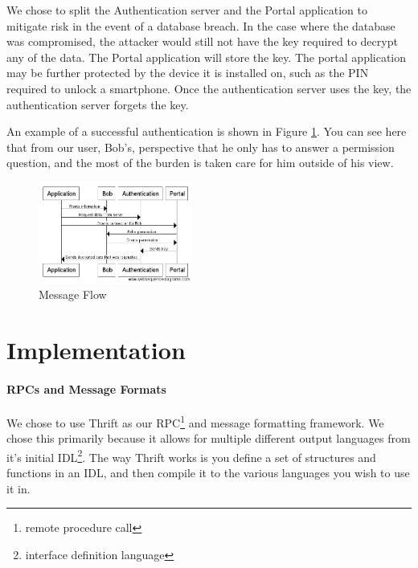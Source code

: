 \documentclass[letterpaper,twocolumn,10pt]{article}
\begin{document}
We chose to split the Authentication server and the Portal application to mitigate risk in the event of a database breach. In the case where the database was compromised, the attacker would still not have the key required to decrypt any of the data. The Portal application will store the key. The portal application may be further protected by the device it is installed on, such as the PIN required to unlock a smartphone. Once the authentication server uses the key, the authentication server forgets the key.


An example of a successful authentication is shown in Figure \ref{messageflow}. You can see here that from our user, Bob's, perspective that he only has to answer a permission question, and the most of the burden is taken care for him outside of his view.

\begin{figure}[ht]
\includegraphics[width=0.45\textwidth]{messageDiagram}
\caption{Message Flow}
\label{messageflow}
\end{figure}

\section{Implementation}

\paragraph{RPCs and Message Formats}
    We chose to use Thrift\cite{thrift} as our RPC\footnote{remote procedure call} and message formatting framework. We chose this primarily because it allows for multiple different output languages from it's initial IDL\footnote{interface definition language}. The way Thrift works is you define a set of structures and functions in an IDL, and then compile it to the various languages you wish to use it in. 
    
\end{document}
